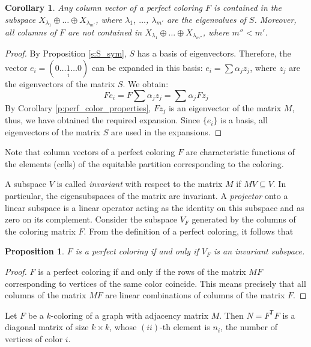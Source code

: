 \documentclass[11pt]{article}
\newtheorem{claim}{Proposition}[section]
\newtheorem{corollary}{Corollary}[section]
\theoremstyle{definition}
\begin{document}
\begin{corollary}\label{p:perf_color_properties1}
Any  column vector of a perfect coloring $F$
 is contained in the subspace
$X_{\lambda_1}\oplus\ldots\oplus X_{\lambda_{m'}}$,
where $\lambda_1$, $\ldots$, $\lambda_{m'}$ are the eigenvalues of  $S$.
Moreover,  all columns of $F$  are not contained in $X_{\lambda_1}\oplus\ldots\oplus X_{\lambda_{m''}}$, where $m''<m'$.
\end{corollary}
\begin{proof}
By Proposition \ref{s:S_sym},  $S$ has a basis of eigenvectors. Therefore, the vector $e_i=(0\ldots \underset{i}{1} \ldots
0)$ can be expanded in this basis: $e_i=\sum \alpha_j z_j$, where
$z_j$
are the eigenvectors of the matrix $S$. We obtain:
\[Fe_i=F\sum \alpha_j z_j=\sum \alpha_j Fz_j\]
By Corollary \ref{p:perf_color_properties}, $Fz_j$ is an eigenvector of the matrix $M$,
thus, we have obtained the required expansion.
Since $\{e_i\}$ is a basis, all  eigenvectors of the matrix $S$ are used in the expansions. 
\end{proof}

Note that  column vectors of a perfect coloring $F$ are characteristic functions of the elements (cells)  of the equitable partition corresponding to the coloring. 


A subspace $V$ is called {\sl invariant} with respect to
the matrix $M$ if $MV\subseteq V$. In particular, the eigensubspaces
of the matrix are invariant.   A {\sl projector} onto a linear subspace
is a linear operator acting  as the identity on this subspace and as zero 
 on its complement.  Consider the subspace
$V_F$ generated by the columns of the coloring matrix $F$. From the definition of a perfect coloring, it follows that

\begin{claim}\label{cl:invar}
$F$ is a perfect coloring if and only if $V_F$ is an invariant subspace.
\end{claim}
\begin{proof}
$F$ is a perfect coloring if and only if the rows
of the matrix $MF$ corresponding to vertices of the same color coincide. This means precisely that all columns of the matrix $MF$ are linear combinations
of columns of the matrix $F$.
\end{proof}
Let $F$ be a $k$-coloring of a graph with adjacency matrix $M$. Then $N=F^{\mathsf T}F$
is a diagonal matrix of size $k\times
k$, whose $(ii)$-th element is $n_i$, the number of vertices of color $i$.
\end{document}
